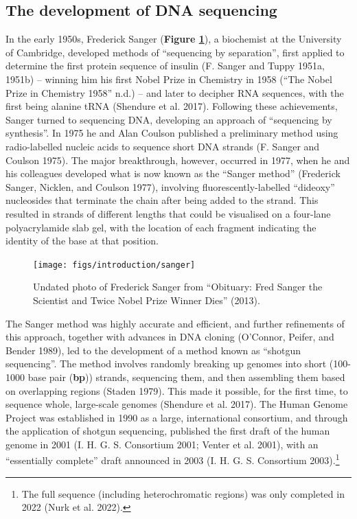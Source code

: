 \documentclass[
]{book}
\begin{document}
\hypertarget{the-development-of-dna-sequencing}{%
\subsection{The development of DNA sequencing}\label{the-development-of-dna-sequencing}}

In the early 1950s, Frederick Sanger (\textbf{Figure \ref{fig:sanger}}), a biochemist at the University of Cambridge, developed methods of ``sequencing by separation'', first applied to determine the first protein sequence of insulin (F. Sanger and Tuppy 1951a, 1951b) -- winning him his first Nobel Prize in Chemistry in 1958 ({``The {Nobel Prize} in {Chemistry} 1958''} n.d.) -- and later to decipher RNA sequences, with the first being alanine tRNA (Shendure et al. 2017). Following these achievements, Sanger turned to sequencing DNA, developing an approach of ``sequencing by synthesis''. In 1975 he and Alan Coulson published a preliminary method using radio-labelled nucleic acids to sequence short DNA strands (F. Sanger and Coulson 1975). The major breakthrough, however, occurred in 1977, when he and his colleagues developed what is now known as the ``Sanger method'' (Frederick Sanger, Nicklen, and Coulson 1977), involving fluorescently-labelled ``dideoxy'' nucleosides that terminate the chain after being added to the strand. This resulted in strands of different lengths that could be visualised on a four-lane polyacrylamide slab gel, with the location of each fragment indicating the identity of the base at that position.



\begin{figure}

{\centering \texttt{[image: figs/introduction/sanger]} 

}

\caption{Undated photo of Frederick Sanger from {``Obituary: {Fred Sanger} the Scientist and Twice {Nobel Prize} Winner Dies''} (2013).}\label{fig:sanger}
\end{figure}

The Sanger method was highly accurate and efficient, and further refinements of this approach, together with advances in DNA cloning (O'Connor, Peifer, and Bender 1989), led to the development of a method known as ``shotgun sequencing''. The method involves randomly breaking up genomes into short (100-1000 base pair (\textbf{bp})) strands, sequencing them, and then assembling them based on overlapping regions (Staden 1979). This made it possible, for the first time, to sequence whole, large-scale genomes (Shendure et al. 2017). The Human Genome Project was established in 1990 as a large, international consortium, and through the application of shotgun sequencing, published the first draft of the human genome in 2001 (I. H. G. S. Consortium 2001; Venter et al. 2001), with an ``essentially complete'' draft announced in 2003 (I. H. G. S. Consortium 2003).\footnote{The full sequence (including heterochromatic regions) was only completed in 2022 (Nurk et al. 2022).}
\end{document}
